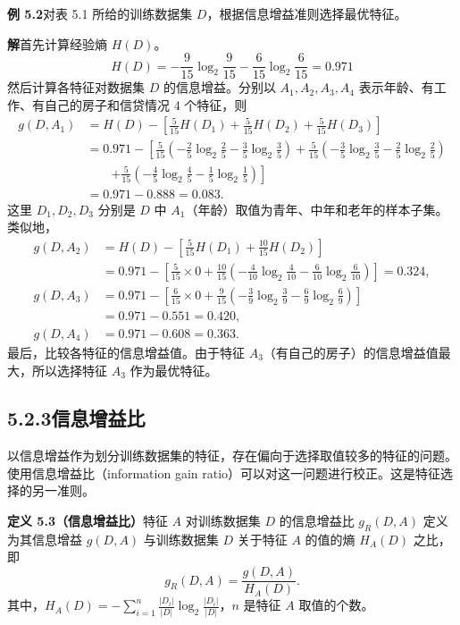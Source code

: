 \documentclass[UTF8, 12pt, fontset=fandol, oneside]{ctexart}
\begin{document}
\noindent\textbf{例 5.2}\quad 对表 5.1 所给的训练数据集 $D$，根据信息增益准则选择最优特征。

\noindent\textbf{解}\quad 首先计算经验熵 $H(D)$。
\[
  H(D)=-\frac{9}{15}\log_2\frac{9}{15}-\frac{6}{15}\log_2\frac{6}{15}=0.971
\]
然后计算各特征对数据集 $D$ 的信息增益。分别以 $A_1,A_2,A_3,A_4$ 表示年龄、有工作、有自己的房子和信贷情况 4 个特征，则
\[
\begin{aligned}
  g(D,A_1)
  &=H(D)-\left[\frac{5}{15}H(D_1)+\frac{5}{15}H(D_2)+\frac{5}{15}H(D_3)\right] \\
  &=0.971-\left[\frac{5}{15}\left(-\frac25\log_2\frac25-\frac35\log_2\frac35\right)
  +\frac{5}{15}\left(-\frac35\log_2\frac35-\frac25\log_2\frac25\right)\right.\\
  &\qquad\left.
  +\frac{5}{15}\left(-\frac45\log_2\frac45-\frac15\log_2\frac15\right)\right] \\
  &=0.971-0.888=0.083 .
\end{aligned}
\]
这里 $D_1,D_2,D_3$ 分别是 $D$ 中 $A_1$（年龄）取值为青年、中年和老年的样本子集。类似地，
\[
\begin{aligned}
  g(D,A_2)
  &=H(D)-\left[\frac{5}{15}H(D_1)+\frac{10}{15}H(D_2)\right] \\
  &=0.971-\left[\frac{5}{15}\times0+\frac{10}{15}\left(-\frac{4}{10}\log_2\frac{4}{10}-\frac{6}{10}\log_2\frac{6}{10}\right)\right]=0.324,\\
  g(D,A_3)
  &=0.971-\left[\frac{6}{15}\times0+\frac{9}{15}\left(-\frac39\log_2\frac39-\frac69\log_2\frac69\right)\right] \\
  &=0.971-0.551=0.420,\\
  g(D,A_4)&=0.971-0.608=0.363 .
\end{aligned}
\]
最后，比较各特征的信息增益值。由于特征 $A_3$（有自己的房子）的信息增益值最大，所以选择特征 $A_3$ 作为最优特征。

\subsection*{5.2.3\quad 信息增益比}

以信息增益作为划分训练数据集的特征，存在偏向于选择取值较多的特征的问题。使用信息增益比（information gain ratio）可以对这一问题进行校正。这是特征选择的另一准则。

\noindent\textbf{定义 5.3（信息增益比）}\quad 特征 $A$ 对训练数据集 $D$ 的信息增益比 $g_R(D,A)$ 定义为其信息增益 $g(D,A)$ 与训练数据集 $D$ 关于特征 $A$ 的值的熵 $H_A(D)$ 之比，即
\begin{equation}
  g_R(D,A)=\frac{g(D,A)}{H_A(D)}.
  \tag{5.10}
\end{equation}
其中，$H_A(D)=-\sum_{i=1}^{n}\frac{|D_i|}{|D|}\log_2\frac{|D_i|}{|D|}$，$n$ 是特征 $A$ 取值的个数。
\end{document}
